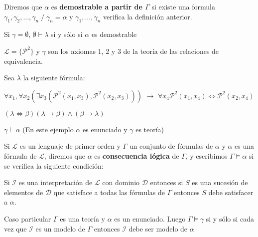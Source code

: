 \begin{definition}

Diremos que $\alpha$ es \textbf{demostrable a partir de $\Gamma$} si existe una formula $\gamma_1, \gamma_2, \ldots, \gamma_n \; / \; \gamma_n = \alpha$ y $\gamma_1, \ldots, \gamma_n$ verifica la definici\'on anterior.

\end{definition}

\begin{observation}

Si $\gamma = \emptyset$, $\emptyset \vdash \lambda$ si y s\'olo si $\alpha$ es demostrable

\end{observation}

\begin{example}

$\mathcal{L} = \{ \mathcal{P}^2\}$ y $\gamma$ son los axiomas 1, 2 y 3 de la teor\'ia de las relaciones de equivalencia.

Sea $\lambda$ la siguiente f\'ormula:

$\forall x_1, \forall x_2 (\exists x_3 (\mathcal{P}^2(x_1, x_3), \mathcal{P}^2(x_2, x_3)))$ 
$\rightarrow$ $\forall x_4 \mathcal{P}^2(x_1, x_4) \iff \mathcal{P}^2(x_2, x_4)$

$(\lambda \iff \beta) (\lambda \rightarrow \beta) \land (\beta \rightarrow \lambda)$

$\gamma \vdash \alpha$ (En este ejemplo $\alpha$ es enunciado y $\gamma$ es teor\'ia)

\end{example}

\begin{definition}

Si $\mathcal{L}$ es un lenguaje de primer orden y $\Gamma$ un conjunto de f\'ormulas de $\alpha$ y $\alpha$ es una f\'ormula de $\mathcal{L}$, diremos que $\alpha$ es \textbf{consecuencia l\'ogica} de $\Gamma$, y escribimos $\Gamma \models \alpha$ si se verifica la siguiente condici\'on:

Si $\mathcal{I}$ es una interpretaci\'on de $\mathcal{L}$ con dominio $\mathcal{D}$ entonces si $S$ es una sucesi\'on de elementos de $\mathcal{D}$ que satisface a todas las f\'ormulas de $\Gamma$ entonces $S$ debe satisfacer a $\alpha$.

Caso particular $\Gamma$ es una teor\'ia y $\alpha$ es un enunciado. Luego $\Gamma \models \gamma$ si y s\'olo si cada vez que $\mathcal{I}$ es un modelo de $\Gamma$ entonces $\mathcal{I}$ debe ser modelo de $\alpha$

\end{definition}

